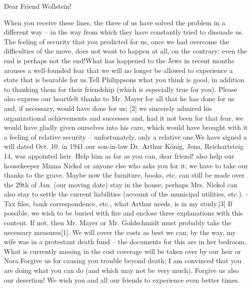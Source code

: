 Dear Friend Wollstein!

When you receive these lines, the three of us have solved the problem in a different way – in the way from which they have constantly tried to dissuade us. The feeling of security that you predicted for us, once we had overcome the difficulties of the move, does not want to happen at all, on the contrary: even the end is perhaps not the end!What has happened to the Jews in recent months arouses a well-founded fear that we will no longer be allowed to experience a state that is bearable for us.Tell Philippsons what you think is good, in addition to thanking them for their friendship (which is especially true for you). Please also express our heartfelt thanks to Mr. Mayer for all that he has done for us and, if necessary, would have done for us; [2] we sincerely admired his organizational achievements and successes and, had it not been for that fear, we would have gladly given ourselves into his care, which would have brought with it a feeling of relative security – unfortunately, only a relative one.We have signed a will dated Oct. 10. in 1941 our son-in-law Dr. Arthur König, Jena, Reichartsteig 14, was appointed heir. Help him as far as you can, dear friend! also help our housekeeper Minna Nickol or anyone else who asks you for it; we have to take our thanks to the grave. Maybe now the furniture, books, etc. can still be made over the 29th of Jan. (our moving date) stay in the house; perhaps Mrs. Nickol can also stay to settle the current liabilities (account of the municipal utilities, etc.). - Tax files, bank correspondence, etc., what Arthur needs, is in my study.[3] If possible, we wish to be buried with fire and enclose three explanations with this content. If not, then Mr. Mayer or Mr. Goldschmidt must probably take the necessary measures[1]. We will cover the costs as best we can; by the way, my wife was in a protestant death fund – the documents for this are in her bedroom. What is currently missing in the cost coverage will be taken over by our heir or Nora.Forgive us for causing you trouble beyond death; I am convinced that you are doing what you can do (and which may not be very much). Forgive us also our desertion! We wish you and all our friends to experience even better times.
